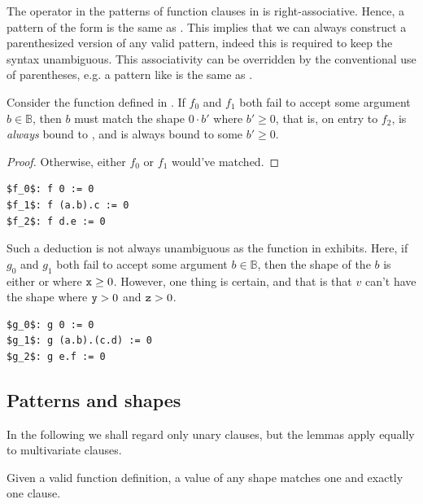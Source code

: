 The  operator in the patterns of function clauses in \D{} is
right-associative. Hence, a pattern of the form  is the same as
. This implies that we can always construct a parenthesized
version of any valid pattern, indeed this is required to keep the syntax
unambiguous. This associativity can be overridden by the conventional use of
parentheses, e.g. a pattern like  is the same as
. 

Consider the function defined in . If $f_0$ and
$f_1$ both fail to accept some argument $b\in\mathbb{B}$, then $b$ must match
the shape $0\cdot b'$ where $b'\geq 0$, that is, on entry to $f_2$,  is
\emph{always} bound to , and  is always bound to some $b'\geq
0$.

\begin{proof} Otherwise, either $f_0$ or $f_1$ would've matched. \end{proof}

\begin{lstlisting}[label=listing:deducing-zero,
  caption={A sample program for showing 0-deduction.}]
$f_0$: f 0 := 0
$f_1$: f (a.b).c := 0
$f_2$: f d.e := 0
\end{lstlisting}

Such a deduction is not always unambiguous as the function in
 exhibits. Here, if $g_0$ and $g_1$ both
fail to accept some argument $b\in\mathbb{B}$, then the shape of the $b$ is
either  or  where $\text{{\ttfamily x}}\geq 0$. However, one thing is
certain, and that is that $v$ can't have the shape  where
$\text{{\ttfamily y}}>0$ and $\text{{\ttfamily z}}>0$.

\begin{lstlisting}[label=listing:deducing-zero-fail,
  caption={A sample program where 0-deduction is ambiguous.}]
$g_0$: g 0 := 0
$g_1$: g (a.b).(c.d) := 0
$g_2$: g e.f := 0
\end{lstlisting}

\subsection{Patterns and shapes}

In the following we shall regard only unary clauses, but the lemmas apply
equally to multivariate clauses.

\begin{lemma} Given a valid function definition, a value of any shape matches
one and exactly one clause. \end{lemma}

